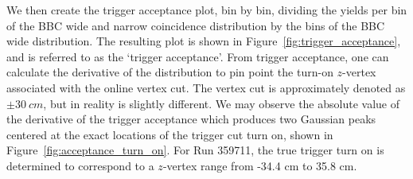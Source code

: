 We then create the trigger acceptance plot, bin by bin, dividing the yields per
bin of the BBC wide and narrow coincidence distribution by the bins of the BBC
wide distribution. The resulting plot is shown in
Figure~\ref{fig:trigger_acceptance}, and is referred to as the `trigger
acceptance'.  From trigger acceptance, one can calculate the derivative of the
distribution to pin point the turn-on $z$-vertex associated with the online
vertex cut. The vertex cut is approximately denoted as $\pm30~cm$, but in
reality is slightly different. We may observe the absolute value of the
derivative of the trigger acceptance which produces two Gaussian peaks centered
at the exact locations of the trigger cut turn on, shown in
Figure~\ref{fig:acceptance_turn_on}. For Run 359711, the true trigger turn on is
determined to correspond to a $z$-vertex range from -34.4 cm to 35.8 cm.


